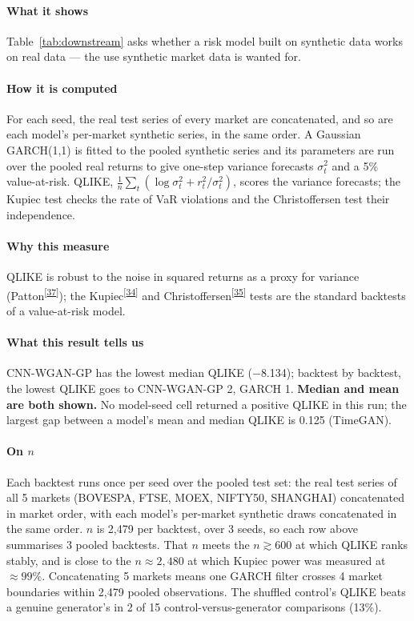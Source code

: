 \documentclass[11pt,a4paper]{article}
\makeatletter
\newcommand{\tcite}[1]{\textsuperscript{[\hyperlink{R:#1}{#1}]}}
\DeclareRobustCommand{\_}{\ifmmode\nfss@text{\textunderscore}\else\textunderscore\allowbreak\fi}
\makeatother
\begin{document}
\paragraph{What it shows} Table~\ref{tab:downstream} asks whether a risk model built on synthetic data works on real data --- the use synthetic market data is wanted for.

\paragraph{How it is computed} For each seed, the real test series of every market are concatenated, and so are each model's per-market synthetic series, in the same order. A Gaussian GARCH(1,1) is fitted to the pooled synthetic series and its parameters are run over the pooled real returns to give one-step variance forecasts $\sigma_t^2$ and a 5\% value-at-risk. QLIKE, $\frac1n\sum_t(\log\sigma_t^2+r_t^2/\sigma_t^2)$, scores the variance forecasts; the Kupiec test checks the rate of VaR violations and the Christoffersen test their independence.

\paragraph{Why this measure} QLIKE is robust to the noise in squared returns as a proxy for variance (Patton\tcite{37}); the Kupiec\tcite{34} and Christoffersen\tcite{35} tests are the standard backtests of a value-at-risk model.

\paragraph{What this result tells us} CNN-WGAN-GP has the lowest median QLIKE ($-$8.134); backtest by backtest, the lowest QLIKE goes to CNN-WGAN-GP 2, GARCH 1. \textbf{Median and mean are both shown.} No model-seed cell returned a positive QLIKE in this run; the largest gap between a model's mean and median QLIKE is 0.125 (TimeGAN).

\paragraph{On $n$} Each backtest runs once per seed over the pooled test set: the real test series of all 5 markets (BOVESPA, FTSE, MOEX, NIFTY50, SHANGHAI) concatenated in market order, with each model's per-market synthetic draws concatenated in the same order. $n$ is 2,479 per backtest, over 3 seeds, so each row above summarises 3 pooled backtests. That $n$ meets the $n\gtrsim600$ at which QLIKE ranks stably, and is close to the $n\approx2{,}480$ at which Kupiec power was measured at $\approx99\%$. Concatenating 5 markets means one GARCH filter crosses 4 market boundaries within 2,479 pooled observations. The shuffled control's QLIKE beats a genuine generator's in 2 of 15 control-versus-generator comparisons (13\%).
\end{document}
